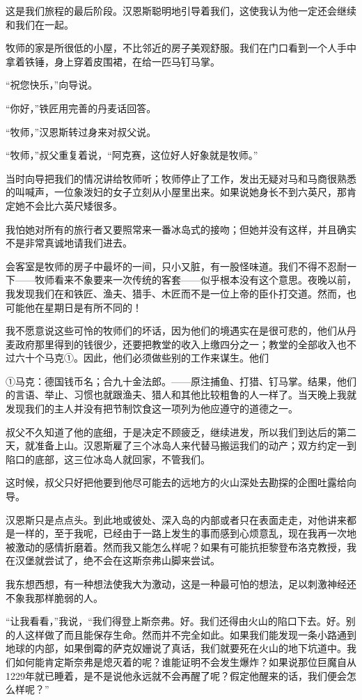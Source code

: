 \documentclass[10pt]{book}
\begin{document}
这是我们旅程的最后阶段。汉恩斯聪明地引导着我们，这使我认为他一定还会继续和我们在一起。

牧师的家是所很低的小屋，不比邻近的房子美观舒服。我们在门口看到一个人手中拿着铁锤，身上穿着皮围裙，在给一匹马钉马掌。

“祝您快乐，”向导说。

“你好，”铁匠用完善的丹麦话回答。

“牧师，”汉恩斯转过身来对叔父说。

“牧师，”叔父重复着说，“阿克赛，这位好人好象就是牧师。”

当时向导把我们的情况讲给牧师听；牧师停止了工作，发出无疑对马和马商很熟悉的叫喊声，一位象泼妇的女子立刻从小屋里出来。如果说她身长不到六英尺，那肯定她不会比六英尺矮很多。

我怕她对所有的旅行者又要照常来一番冰岛式的接吻；但她并没有这样，并且确实不是非常真诚地请我们进去。

会客室是牧师的房子中最坏的一间，只小又脏，有一股怪味道。我们不得不忍耐一下——牧师看来不象要来一次传统的客套——似乎根本没有这个意思。夜晚以前，我发现我们在和铁匠、渔夫、猎手、木匠而不是一位上帝的臣仆打交道。然而，也可能他在星期日是有所不同的！

我不愿意说这些可怜的牧师们的坏话，因为他们的境遇实在是很可悲的，他们从丹麦政府那里得到的钱很少，还要把教堂的收入上缴四分之一；教堂的全部收入也不过六十个马克①。因此，他们必须做些别的工作来谋生。他们

①马克：德国钱币名；合九十金法郎。——原注捕鱼、打猎、钉马掌。结果，他们的言语、举止、习惯也就跟渔夫、猎人和其他比较粗鲁的人一样了。当天晚上我就发现我们的主人并没有把节制饮食这一项列为他应遵守的道德之一。

叔父不久知道了他的底细，于是决定不顾疲乏，继续进发，所以我们到达后的第二天，就准备上山。汉恩斯雇了三个冰岛人来代替马搬运我们的动产；双方约定一到陷口的底部，这三位冰岛人就回家，不管我们。

这时候，叔父只好把他要到他尽可能去的远地方的火山深处去勘探的企图吐露给向导。

汉恩斯只是点点头。到此地或彼处、深入岛的内部或者只在表面走走，对他讲来都是一样的，至于我呢，已经由于一路上发生的事而感到心烦意乱，现在我再一次地被激动的感情折磨着。然而我又能怎么样呢？如果有可能抗拒黎登布洛克教授，我在汉堡就尝试了，绝不会在这斯奈弗山脚来尝试。

我东想西想，有一种想法使我大为激动，这是一种最可怕的想法，足以刺激神经还不象我那样脆弱的人。

“让我看看，”我说，“我们得登上斯奈弗。好。我们还得由火山的陷口下去。好。别的人这样做了而且能保存生命。然而并不完全如此。如果我们能发现一条小路通到地球的内部，如果倒霉的萨克奴姗说了真话，我们就要死在火山的地下坑道中。我们如何能肯定斯奈弗是熄灭着的呢？谁能证明不会发生爆炸？如果说那位巨魔自从1229年就已睡着，是不是说他永远就不会再醒了呢？假定他醒来的话，我们便会怎么样呢？”
\end{document}
